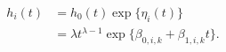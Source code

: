\begin{align}
  h_{i}(t) &= h_{0}(t) \exp\{\eta_{i}(t)\} \\
  &= \lambda t^{\lambda - 1} \exp\{\beta_{0, i, k} + \beta_{1, i, k}t \}.
  \label{eqn:submodel-two-hazard-general}
\end{align}